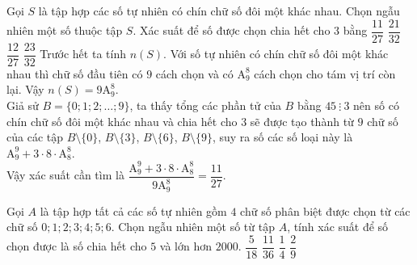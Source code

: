 \begin{ex}%
 Gọi $S$ là tập hợp các số tự nhiên có chín chữ số đôi một khác nhau. Chọn ngẫu nhiên một số thuộc tập $S$. Xác suất để số được chọn chia hết cho $3$ bằng
 \choice
  {\True $\dfrac{11}{27}$}
  {$\dfrac{21}{32}$}
  {$\dfrac{12}{27}$}
  {$\dfrac{23}{32}$}
 \loigiai
  {
  Trước hết ta tính $n(S)$. Với số tự nhiên có chín chữ số đôi một khác nhau thì chữ số đầu tiên có $9$ cách chọn và có $\mathrm{A}_9^8$ cách chọn cho tám vị trí còn lại. Vậy $n(S)=9\mathrm{A}_9^8$.\\
  Giả sử $B=\{0;1;2;\ldots;9\}$, ta thấy tổng các phần tử của $B$ bằng $45\ \vdots\ 3$ nên số có chín chữ số đôi một khác nhau và chia hết cho $3$ sẽ được tạo thành từ $9$ chữ số của các tập $B\setminus\{0\}$, $B\setminus\{3\}$, $B\setminus\{6\}$, $B\setminus\{9\}$, suy ra số các số loại này là $\mathrm{A}_9^9+3\cdot 8\cdot \mathrm{A}_8^8$.\\
  Vậy xác suất cần tìm là $\dfrac{\mathrm{A}_9^9+3\cdot 8\cdot \mathrm{A}_8^8}{9\mathrm{A}_9^8} = \dfrac{11}{27}$.
  }
\end{ex}%
\begin{ex}%
Gọi $A$ là tập hợp tất cả các số tự nhiên gồm $4$ chữ số phân biệt được chọn từ các chữ số
$0;1; 2;3;4;5;6$. Chọn ngẫu nhiên một số từ tập $A$, tính xác suất để số chọn được là số chia hết cho $5$
và lớn hơn $2000$.
\choice
{$\dfrac{5}{18}$}
{$\dfrac{11}{36}$}
{\True $\dfrac{1}{4}$}
{$\dfrac{2}{9}$}
\end{ex}%
